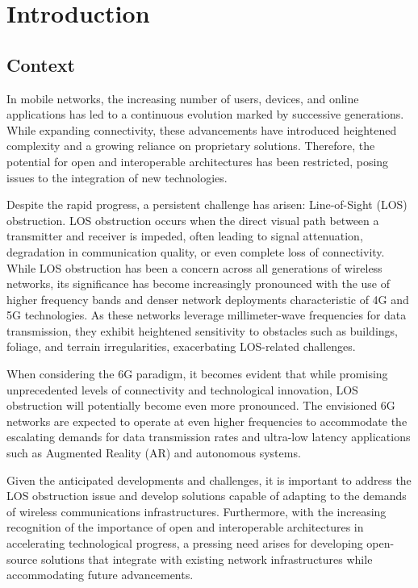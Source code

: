 \chapter{Introduction} \label{ch:intro}

\section{Context}

In mobile networks, the increasing number of users, devices, and online applications has led to a continuous evolution marked by successive generations. While expanding connectivity, these advancements have introduced heightened complexity and a growing reliance on proprietary solutions. Therefore, the potential for open and interoperable architectures has been restricted, posing issues to the integration of new technologies. 

Despite the rapid progress, a persistent challenge has arisen: Line-of-Sight (LOS) obstruction. LOS obstruction occurs when the direct visual path between a transmitter and receiver is impeded, often leading to signal attenuation, degradation in communication quality, or even complete loss of connectivity. While LOS obstruction has been a concern across all generations of wireless networks, its significance has become increasingly pronounced with the use of higher frequency bands and denser network deployments characteristic of 4G and 5G technologies. As these networks leverage millimeter-wave frequencies for data transmission, they exhibit heightened sensitivity to obstacles such as buildings, foliage, and terrain irregularities, exacerbating LOS-related challenges.

When considering the 6G paradigm, it becomes evident that while promising unprecedented levels of connectivity and technological innovation,  LOS obstruction will potentially become even more pronounced. The envisioned 6G networks are expected to operate at even higher frequencies to accommodate the escalating demands for data transmission rates and ultra-low latency applications such as Augmented Reality (AR) and autonomous systems.

Given the anticipated developments and challenges, it is important to address the  LOS obstruction issue and develop solutions capable of adapting to the demands of wireless communications infrastructures. Furthermore, with the increasing recognition of the importance of open and interoperable architectures in accelerating technological progress, a pressing need arises for developing open-source solutions that integrate with existing network infrastructures while accommodating future advancements.

